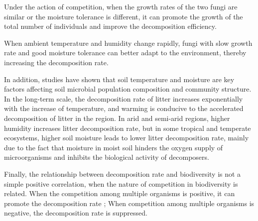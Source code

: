 \documentclass{mcmthesis}
\begin{document}
Under the action of competition, when the growth rates of the two fungi are similar or the moisture tolerance is different, it can promote the growth of the total number of individuals and improve the decomposition efficiency.

When ambient temperature and humidity change rapidly, fungi with slow growth rate and good moisture tolerance can better adapt to the environment, thereby increasing the decomposition rate. 

In addition, studies have shown that soil temperature and moisture are key factors affecting soil microbial population composition and community structure. In the long-term scale, the decomposition rate of litter increases exponentially with the increase of temperature, and warming is conducive to the accelerated decomposition of litter in the region. In arid and semi-arid regions, higher humidity increases litter decomposition rate, but in some tropical and temperate ecosystems, higher soil moisture leads to lower litter decomposition rate, mainly due to the fact that moisture in moist soil hinders the oxygen supply of microorganisms and inhibits the biological activity of decomposers. 

Finally, the relationship between decomposition rate and biodiversity is not a simple positive correlation, when the nature of competition in biodiversity is related. When the competition among multiple organisms is positive, it can promote the decomposition rate ; When competition among multiple organisms is negative, the decomposition rate is suppressed.
\end{document}
